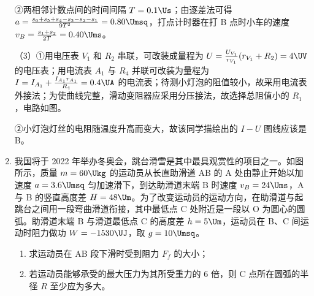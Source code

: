 \documentclass[\gkver]{gaokaozhenti}
\begin{document}
\begin{enumerate}
{②两相邻计数点间的时间间隔 $T = 0.1\Us$；由逐差法可得 $a = \frac{s_6 + s_5 + s_4 - s_3 - s_2 - s_1}{9T^2} = 0.80\Umsq$，打点计时器在打 B 点时小车的速度 $v_B = \frac{s_1 + s_2}{2T} = 0.40\Ums$。

（3）①用电压表 $V_1$ 和 $R_2$ 串联，可改装成量程为 $U = \frac{U_{V_1}}{r_{V_1}} (r_{V_1} + R_2) = 4\UV$ 的电压表；用电流表 $A_1$ 与 $R_4$ 并联可改装为量程为 $I = I_{A_1} + \frac{I_{A_1} r_{A_1}}{R_4} = 0.4\UA$ 的电流表；待测小灯泡的阻值较小，故采用电流表外接法；为使曲线完整，滑动变阻器应采用分压接法，故选择总阻值小的 $R_1$，电路如图。

②小灯泡灯丝的电阻随温度升高而变大，故该同学描绘出的 $I-U$ 图线应该是 B。
}

\item
我国将于 2022 年举办冬奥会，跳台滑雪是其中最具观赏性的项目之一。如图所示，质量 $m = 60\Ukg$ 的运动员从长直助滑道 AB 的 A 处由静止开始以加速度 $a = 3.6\Umsq$ 匀加速滑下，到达助滑道末端 B 时速度 $v_{B} = 24\Ums$，A 与 B 的竖直高度差 $H = 48\Um$。为了改变运动员的运动方向，在助滑道与起跳台之间用一段弯曲滑道衔接，其中最低点 C 处附近是一段以 O 为圆心的圆弧。助滑道末端 B 与滑道最低点 C 的高度差 $h = 5\Um$，运动员在 B、C 间运动时阻力做功 $W = -1530\UJ$，取 $g = 10\Umsq$。
\begin{enumerate}
	\item
	求运动员在 AB 段下滑时受到阻力 $F_{f}$ 的大小；
	\item
	若运动员能够承受的最大压力为其所受重力的 6 倍，则 C 点所在圆弧的半径 $R$ 至少应为多大。
\end{enumerate}
\onepicture[align=right, w=6.86cm]{}

\jdanswer{
\begin{enumerate}
	\item
	$144\UN$

	\item
	$12.5\Um$

\end{enumerate}
}
\end{enumerate}
\end{document}
